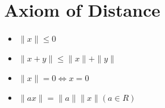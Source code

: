 \documentclass[11pt, a4paper]{jsarticle}
\begin{document}
\section {Axiom of Distance}

\begin{itemize}
  \item $ \|x\| \leq 0 $
  \item $ \|x+y\| \leq \|x\| + \|y\| $
  \item $ \|x\| = 0 \Leftrightarrow x = 0 $
  \item $ \|ax\| = \|a\| \|x\| (a \in R) $
\end{itemize}
\end{document}

